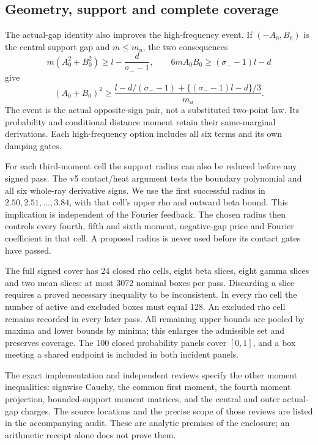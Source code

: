 \subsection{Geometry, support and complete coverage}
The actual-gap identity also improves the high-frequency event.
If $(-A_0,B_0)$ is the central support gap and $m\le m_u$, the two
consequences
\[
 m(A_0^2+B_0^2)\ge l-\frac d{\sigma_- -1},\qquad
 6mA_0B_0\ge(\sigma_- -1)l-d
\]
give
\[
 (A_0+B_0)^2\ge
 \frac{l-d/(\sigma_- -1)+\{(\sigma_- -1)l-d\}/3}{m_u}.
\]
The event is the actual opposite-sign pair, not a substituted two-point
law. Its probability and conditional distance moment retain their
same-marginal derivations. Each high-frequency option includes all six
terms and its own damping gates.

For each third-moment cell the support radius can also be reduced before
any signed pass. The v5 contact/heat argument tests the boundary polynomial
and all six whole-ray derivative signs. We use the first successful
radius in $2.50,2.51,\ldots,3.84$, with that cell's upper rho and outward
beta bound. This implication is independent of the Fourier feedback.
The chosen radius then controls every fourth, fifth and sixth moment,
negative-gap price and Fourier coefficient in that cell. A proposed
radius is never used before its contact gates have passed.

The full signed cover has 24 closed rho cells, eight beta slices, eight
gamma slices and two mean slices: at most 3072 nominal boxes per pass.
Discarding a slice requires a proved necessary inequality to be
inconsistent. In every rho cell the number of active and excluded boxes
must equal 128. An excluded rho cell remains recorded in every later pass.
All remaining upper bounds are pooled by maxima and lower bounds by
minima; this enlarges the admissible set and preserves coverage.
The 100 closed probability panels cover $[0,1]$, and a box meeting a
shared endpoint is included in both incident panels.

The exact implementation and independent reviews specify the other
moment inequalities: signwise Cauchy, the common first moment, the fourth
moment projection, bounded-support moment matrices, and the central and
outer actual-gap charges. The source locations and the precise scope of
those reviews are listed in the accompanying audit. These are analytic
premises of the enclosure; an arithmetic receipt alone does not prove them.

